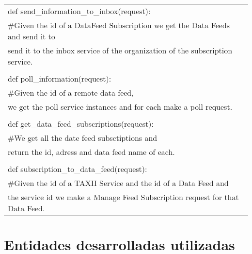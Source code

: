 \begin{center}
\begin{longtable}{|l|}
			def send\_information\_to\_inbox(request):\\
			\#Given the id of a DataFeed Subscription we get the Data Feeds and send it to\\ send it to the inbox service of the organization of the subscription service.\\ \\
			
			def poll\_information(request):\\
			\#Given the id of a remote data feed,\\ we get the poll service instances and for each make a poll request.\\ \\
			
			def get\_data\_feed\_subscriptions(request):\\
			\#We get all the date feed subsctiptions and\\ return the id, adress and data feed name of each.\\ \\
			
			def subscription\_to\_data\_feed(request):\\
			\#Given the id of a TAXII Service and the id of a Data Feed and\\ the service id we make a Manage Feed Subscription request for that Data Feed.\\		
			
			\hline
		\end{longtable}
	\end{center}
	\newpage

\section{Entidades desarrolladas utilizadas}
	
